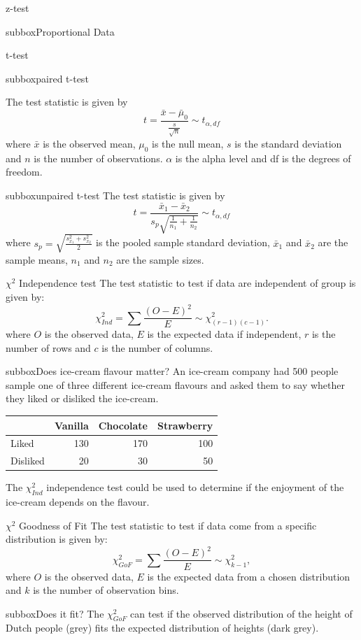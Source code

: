 \documentclass[10pt,a4paper]{article}
\begin{document}
\begin{multicols}{3}
\begin{textbox}{z-test}
\begin{subbox}{subbox}{Proportional Data}
\end{subbox}
\end{textbox}
\begin{textbox}{t-test}
\begin{subbox}{subbox}{paired t-test}

 The test statistic is given by  \[ t={\frac {{\bar {x}}-{\bar \mu_0}}{\frac{s}{\sqrt n}}} \sim t_{\alpha,df}\]
where $\bar{x}$ is the observed mean, $\mu_0$ is the null mean, $s$ is the standard deviation and $n$ is the number of observations.
$\alpha$ is the alpha level and df is the degrees of freedom.
\end{subbox}
\begin{subbox}{subbox}{unpaired t-test}
The test statistic is given by
\[ t={\frac {{\bar {x}}_{1}-{\bar {x}}_{2}}{s_{p}{\sqrt {\frac {1}{n_1}+\frac{1}{n_2}}}}} \sim t_{\alpha,df}\]
 where
$s_{p}={\sqrt{\frac {s_{x_{1}}^{2}+s_{x_{2}}^{2}}{2}}}$ is the pooled sample standard deviation, $\bar{x}_1$ and $\bar{x}_2$ are the sample means, $n_1$ and $n_2$ are the sample sizes.
\end{subbox}
\end{textbox}
\begin{textbox}{$\chi^2$ Independence test}
The test statistic to test if data are independent of group is given by:
   	\[\chi^2_{Ind}=\sum \frac{(O-E)^2}{E} \sim \chi^2_{(r-1)(c-1)}.\]
where $O$ is the observed data, $E$ is the expected data if independent, $r$ is the number of rows and $c$ is the number of columns.\\
\begin{subbox}{subbox}{Does ice-cream flavour matter?}
\tiny
An ice-cream company had 500 people sample one of three different ice-cream flavours and asked them to say whether they liked or disliked the ice-cream. 
\begin{center}
\begin{tabular}{|l|r|r|r|}
\hline
&Vanilla&Chocolate& Strawberry\\
\hline
Liked&130&170&100\\
\hline
Disliked&20&30&50\\
\hline
\end{tabular}
\end{center}
The $\chi^2_{Ind}$ independence test could be used to determine if the enjoyment of the ice-cream depends on the flavour.\\
\end{subbox}
\end{textbox}
\begin{textbox}{$\chi^2$ Goodness of Fit}
The test statistic to test if data come from a specific distribution is given by:
\[\chi^2_{GoF}=\sum \frac{(O-E)^2}{E} \sim\chi^2_{k-1},\]
where $O$ is the observed data, $E$ is the expected data from a chosen distribution and $k$ is the number of observation bins.
\begin{subbox}{subbox}{Does it fit?}
\tiny
The $\chi^2_{GoF}$ can test if the observed distribution of the height of Dutch people (grey) fits the expected distribution of heights (dark grey).


\end{subbox}
\end{textbox}
\end{multicols}
\end{document}
